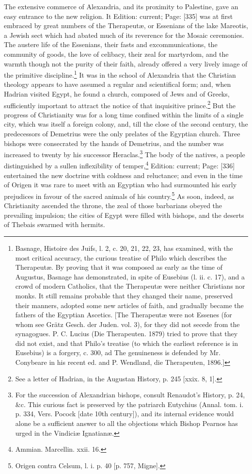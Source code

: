 The extensive commerce of Alexandria, and its proximity to Palestine, gave an easy entrance to the new religion. It Edition: current; Page: [335] was at first embraced by great numbers of the Therapeutæ, or Essenians of the lake Mareotis, a Jewish sect which had abated much of its reverence for the Mosaic ceremonies. The austere life of the Essenians, their fasts and excommunications, the community of goods, the love of celibacy, their zeal for martyrdom, and the warmth though not the purity of their faith, already offered a very lively image of the primitive discipline.\footnote{Basnage, Histoire des Juifs, l. 2, c. 20, 21, 22, 23, has examined, with the most critical accuracy, the curious treatise of Philo which describes the Therapeutæ. By proving that it was composed as early as the time of Augustus, Basnage has demonstrated, in spite of Eusebius (l. ii. c. 17), and a crowd of modern Catholics, that the Therapeutæ were neither Christians nor monks. It still remains probable that they changed their name, preserved their manners, adopted some new articles of faith, and gradually became the fathers of the Egyptian Ascetics. [The Therapeutæ were not Essenes (for whom see Grätz Gesch. der Juden. vol. 3), for they did not secede from the synagogues. P. C. Lucius (Die Therapeuten. 1879) tried to prove that they did not exist, and that Philo\texthebrew{}’s treatise (to which the earliest reference is in Eusebius) is a forgery, c. 300, ad The genuineness is defended by Mr. Conybeare in his recent ed. and P. Wendland, die Therapeuten, 1896.]} It was in the school of Alexandria that the Christian theology appears to have assumed a regular and scientifical form; and, when Hadrian visited Egypt, he found a church, composed of Jews and of Greeks, sufficiently important to attract the notice of that inquisitive prince.\footnote{See a letter of Hadrian, in the Augustan History, p. 245 [xxix. 8, 1].} But the progress of Christianity was for a long time confined within the limits of a single city, which was itself a foreign colony, and, till the close of the second century, the predecessors of Demetrius were the only prelates of the Egyptian church. Three bishops were consecrated by the hands of Demetrius, and the number was increased to twenty by his successor Heraclas.\footnote{For the succession of Alexandrian bishops, consult Renaudot\texthebrew{}’s History, p. 24, \&c. This curious fact is preserved by the patriarch Eutychius (Annal. tom. i. p. 334, Vers. Pocock [date 10th century]), and its internal evidence would alone be a sufficient answer to all the objections which Bishop Pearnos has urged in the Vindiciæ Ignatianæ.} The body of the natives, a people distinguished by a sullen inflexibility of temper,\footnote{Ammian. Marcellin. xxii. 16.} Edition: current; Page: [336] entertained the new doctrine with coldness and reluctance; and even in the time of Origen it was rare to meet with an Egyptian who had surmounted his early prejudices in favour of the sacred animals of his country.\footnote{Origen contra Celsum, l. i. p. 40 [p. 757, Migne].} As soon, indeed, as Christianity ascended the throne, the zeal of those barbarians obeyed the prevailing impulsion; the cities of Egypt were filled with bishops, and the deserts of Thebais swarmed with hermits.

